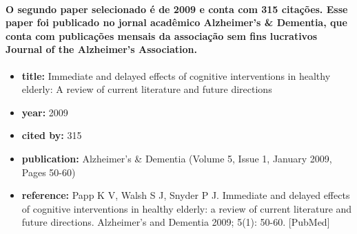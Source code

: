 \documentclass[a4paper]{article}    %
\begin{document}

\paragraph{O segundo paper selecionado é de 2009 e conta com 315 citações. Esse paper foi publicado no jornal acadêmico Alzheimer's \& Dementia, que conta com publicações mensais da associação sem fins lucrativos Journal of the Alzheimer's Association.}

\begin{itemize}
    \item \textbf{title:} Immediate and delayed effects of cognitive interventions in healthy elderly: A review of current literature and future directions
    \item \textbf{year:} 2009
    \item \textbf{cited by:} 315
    \item \textbf{publication:} Alzheimer's \& Dementia (Volume 5, Issue 1, January 2009, Pages 50-60)
    \item \textbf{reference:} Papp K V, Walsh S J, Snyder P J. Immediate and delayed effects of cognitive interventions in healthy elderly: a review of current literature and future directions. Alzheimer's and Dementia 2009; 5(1): 50-60. [PubMed]
\end{itemize}

\end{document}
